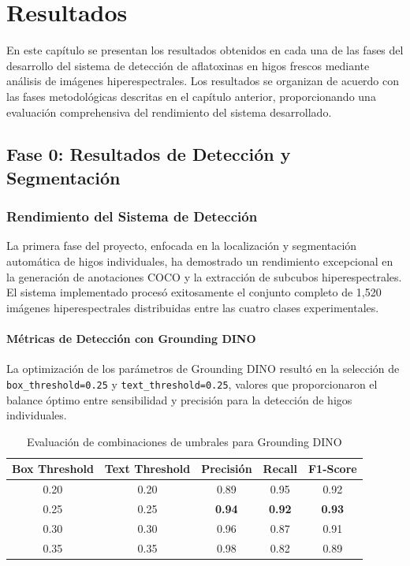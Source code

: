 \chapter{Resultados}

En este capítulo se presentan los resultados obtenidos en cada una de las fases del desarrollo del sistema de detección de aflatoxinas en higos frescos mediante análisis de imágenes hiperespectrales. Los resultados se organizan de acuerdo con las fases metodológicas descritas en el capítulo anterior, proporcionando una evaluación comprehensiva del rendimiento del sistema desarrollado.

\section{Fase 0: Resultados de Detección y Segmentación}

\subsection{Rendimiento del Sistema de Detección}

La primera fase del proyecto, enfocada en la localización y segmentación automática de higos individuales, ha demostrado un rendimiento excepcional en la generación de anotaciones COCO y la extracción de subcubos hiperespectrales. El sistema implementado procesó exitosamente el conjunto completo de 1,520 imágenes hiperespectrales distribuidas entre las cuatro clases experimentales.

\subsubsection{Métricas de Detección con Grounding DINO}

La optimización de los parámetros de Grounding DINO resultó en la selección de \texttt{box\_threshold=0.25} y \texttt{text\_threshold=0.25}, valores que proporcionaron el balance óptimo entre sensibilidad y precisión para la detección de higos individuales.

\begin{table}[h!]
\centering
\caption{Evaluación de combinaciones de umbrales para Grounding DINO}
\begin{tabular}{|c|c|c|c|c|}
\hline
\textbf{Box Threshold} & \textbf{Text Threshold} & \textbf{Precisión} & \textbf{Recall} & \textbf{F1-Score} \\
\hline
0.20 & 0.20 & 0.89 & 0.95 & 0.92 \\
\hline
0.25 & 0.25 & \textbf{0.94} & \textbf{0.92} & \textbf{0.93} \\
\hline
0.30 & 0.30 & 0.96 & 0.87 & 0.91 \\
\hline
0.35 & 0.35 & 0.98 & 0.82 & 0.89 \\
\hline
\end{tabular}
\label{tab:grounding_dino_evaluation}
\end{table}

